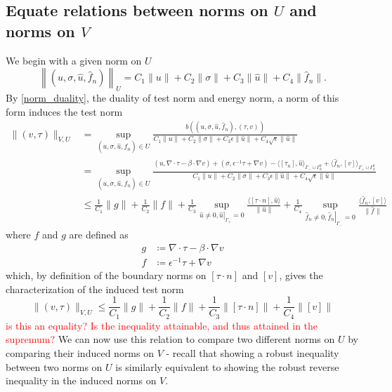 \documentclass[11pt,onecolumn]{scrartcl}
\newcommand{\grad}{\nabla}
\renewcommand{\div}{\grad \cdot}
\begin{document}
\subsection{Equate relations between norms on $U$ and norms on $V$}
\label{sec:strategy1}
We begin with a given norm on $U$
\[
\left\|\left(u,\sigma,\widehat{u},\widehat{f}_n\right)\right\|_U = C_1 \|u\| + C_2 \|\sigma\| + C_3 \|\widehat{u}\| + C_4 \|\widehat{f}_n\|.
\]
By \eqref{norm_duality}, the duality of test norm and energy norm, a norm of this form induces the test norm
\begin{align*}
\|\left(v,\tau\right)\|_{V,U} &= \sup_{\left(u,\sigma,\widehat{u},\widehat{f}_n\right)\in U}\frac{b\left(\left(u,\sigma,\widehat{u},\widehat{f}_n\right),\left(\tau,v\right)\right)}{C_1\|u\| + C_2\|\sigma\| + C_3\epsilon\|\widehat{u}\|+ C_4\sqrt{\epsilon}\|\widehat{u}\|}\\
&= \sup_{\left(u,\sigma,\widehat{u},\widehat{f}_n\right)\in U}\frac{\left(u,\div \tau - \beta \cdot \grad v\right) + \left(\sigma, \epsilon^{-1} \tau + \grad v\right) - \langle \left[\tau_n\right], \widehat{u} \rangle_{\Gamma_-\cup \Gamma_h^0} + \langle \widehat{f}_n, \left[v\right] \rangle_{\Gamma_+ \cup \Gamma_h^0}}{C_1\|u\| + C_2\|\sigma\| + C_3\epsilon\|\widehat{u}\|+ C_4\sqrt{\epsilon}\|\widehat{u}\|}\\
& \leq \frac{1}{C_1}\|g\| + \frac{1}{C_2}\|f\| + \frac{1}{C_3}\sup_{\widehat{u}\neq 0, \left.\widehat{u}\right|_{\Gamma_+} = 0} \frac{\langle [\tau\cdot n], \widehat{u}\rangle}{\|\widehat{u}\|} +\frac{1}{C_4}\sup_{\widehat{f}_n\neq 0, \left.\widehat{f}_n\right|_{\Gamma_-}=0}\frac{\langle \widehat{f}_n, [v]\rangle}{\|\widehat{f}\|}
\end{align*}
where $f$ and $g$ are defined as 
\begin{align*}
g &\coloneqq \div \tau - \beta \cdot \grad v\\
f &\coloneqq \epsilon^{-1}\tau + \grad v
\end{align*}
which, by definition of the boundary norms on $[\tau\cdot n]$ and $[v]$, gives the characterization of the induced test norm 
\[
\|\left(v,\tau\right)\|_{V,U} \leq \frac{1}{C_1}\|g\| + \frac{1}{C_2}\|f\| + \frac{1}{C_3}\|[\tau\cdot n]\| + \frac{1}{C_4}\|[v]\|
\]
\textcolor{red}{is this an equality? Is the inequality attainable, and thus attained in the supremum?} We can now use this relation to compare two different norms on $U$ by comparing their induced norms on $V$ - recall that showing a robust inequality between two norms on $U$ is similarly equivalent to showing the robust reverse inequality in the induced norms on $V$.  
\end{document}
